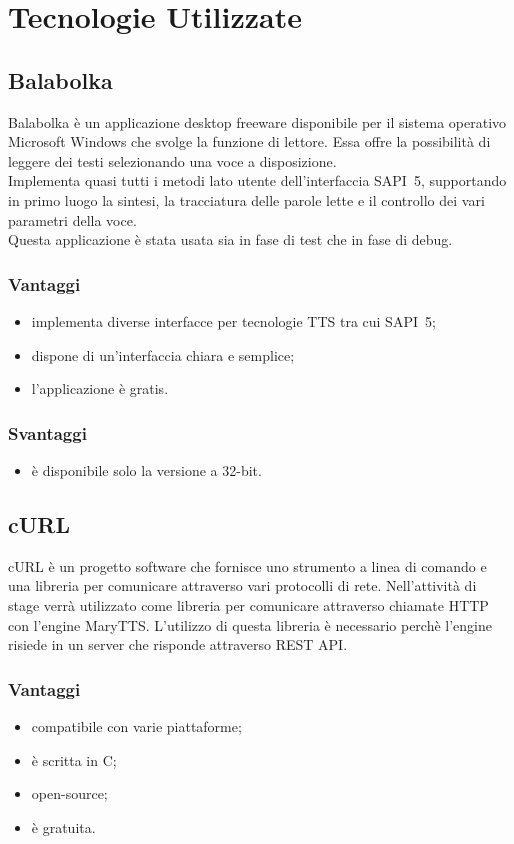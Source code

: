 \chapter{Tecnologie Utilizzate} %
\thispagestyle{empty}

\newpage
\section{Balabolka}
Balabolka è un applicazione desktop freeware disponibile per il sistema operativo Microsoft Windows che svolge la funzione di lettore. Essa offre la possibilità di leggere dei testi selezionando una voce a disposizione.\\
Implementa quasi tutti i metodi lato utente dell'interfaccia SAPI~5, supportando in primo luogo la sintesi, la tracciatura delle parole lette e il controllo dei vari parametri della voce.\\
Questa applicazione è stata usata sia in fase di test che in fase di debug.
\subsection*{Vantaggi}
\begin{itemize}
	\item implementa diverse interfacce per tecnologie TTS tra cui SAPI~5;
	\item dispone di un'interfaccia chiara e semplice;
	\item l'applicazione è gratis.
\end{itemize}
\subsection*{Svantaggi}
\begin{itemize}
	\item è disponibile solo la versione a 32-bit.
\end{itemize}

\section{cURL}
cURL è un progetto software che fornisce uno strumento a linea di comando e una libreria per comunicare attraverso vari protocolli di rete.
Nell'attività di stage verrà utilizzato come libreria per comunicare attraverso chiamate HTTP con l'engine MaryTTS.
L'utilizzo di questa libreria è necessario perchè l'engine risiede in un server che risponde attraverso REST API.
\subsection*{Vantaggi}
\begin{itemize}
	\item compatibile con varie piattaforme;
	\item è scritta in C;
	\item open-source;
	\item è gratuita.
\end{itemize}

